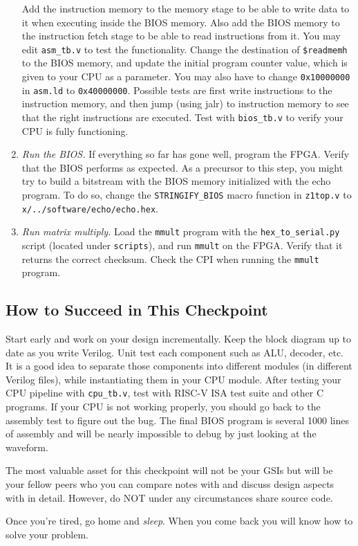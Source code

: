 \begin{enumerate}
  Add the instruction memory to the memory stage to be able to write data to it when executing inside the BIOS memory.
  Also add the BIOS memory to the instruction fetch stage to be able to read instructions from it.
  You may edit \verb|asm_tb.v| to test the functionality.
  Change the destination of \verb|$readmemh| to the BIOS memory,
  and update the initial program counter value, which is given to your CPU as a parameter.
  You may also have to change \verb|0x10000000| in \verb|asm.ld| to \verb|0x40000000|.
  Possible tests are first write instructions to the instruction memory,
  and then jump (using jalr) to instruction memory to see that the right instructions are executed.
  Test with \verb|bios_tb.v| to verify your CPU is fully functioning.
\item \textit{Run the BIOS.}
  If everything so far has gone well, program the FPGA.
  Verify that the BIOS performs as expected.
  As a precursor to this step, you might try to build a bitstream with the BIOS memory initialized with the echo program.
  To do so, change the \verb|STRINGIFY_BIOS| macro function in \verb|z1top.v| to \verb|x/../software/echo/echo.hex|.
\item \textit{Run matrix multiply.}
  Load the \verb|mmult| program with the \verb|hex_to_serial.py| script (located under \texttt{scripts}),
  and run \verb|mmult| on the FPGA. Verify that it returns the correct checksum.
  Check the CPI when running the \verb|mmult| program.
\end{enumerate}


\subsection{How to Succeed in This Checkpoint}
Start early and work on your design incrementally.
Keep the block diagram up to date as you write Verilog.
Unit test each component such as ALU, decoder, etc.
It is a good idea to separate those components into different modules (in different Verilog files), while instantiating them in your CPU module.
After testing your CPU pipeline with \verb|cpu_tb.v|, test with RISC-V ISA test suite and other C programs.
If your CPU is not working properly, you should go back to the assembly test to figure out the bug.
The final BIOS program is several 1000 lines of assembly and will be nearly impossible to debug by just looking at the waveform.

The most valuable asset for this checkpoint will not be your GSIs but will be your fellow peers who you can compare notes with and discuss design aspects with in detail.
However, do NOT under any circumstances share source code.

Once you're tired, go home and \textit{sleep}. When you come back you will know how to solve your problem.

\newpage
